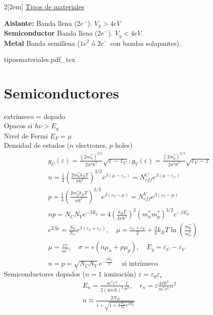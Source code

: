 \documentclass[leqno]{article}
\newcommand{\incfig}[1]{%
\begin{center}
\def\svgwidth{0.9\columnwidth}
{#1.pdf_tex}
\end{center}
}
\begin{document}
\begin{multicols}{2}[\columnsep2em]
\underline{Tipos de materiales}

\textbf{Aislante:} Banda llena (2$e^-$). $V_g>4eV$\\
\textbf{Semiconductor} Banda llena ($2e^-$).  $V_g<4eV$.\\
\textbf{Metal} Banda semillena ($1e^2$ ó $2e^-$ con bandas solapantes).

\incfig{tiposmateriales}

\section{Semiconductores}
extrínseco = dopado\\
Opacos si $h \nu > E_g$\\
Nivel de Fermi $E_F = \mu$\\
Densidad de estados ($n$ electrones, $p$ holes)
\begin{align*}
&g_C(\varepsilon ) = \frac{(2m^*_n) ^{2 /3}}{2\pi ^2\hbar ^3}\sqrt{\varepsilon -\varepsilon _C} ; 
g_V(\varepsilon ) = \frac{(2m^*_p) ^{2 /3}}{2\pi ^2\hbar ^3}\sqrt{\varepsilon _V-\varepsilon } \\
&n = \frac{1}{4}\left(\frac{2 m^*_nk_BT}{\pi \hbar ^2}\right)^{3 /2} e ^{\beta(\mu -\varepsilon _C)} = N_{eff}^C e ^{\beta (\mu -\varepsilon _C)}\\
&p = \frac{1}{4}\left(\frac{2 m^*_pk_BT}{\pi \hbar ^2}\right)^{3 /2} e ^{\beta(\varepsilon _V-\mu )} = N_{eff}^V e ^{\beta (\varepsilon _V-\mu )}\\
& np = N_CN_V e ^{-\beta E_g} = 4 \left(\frac{k_BT}{2\pi \hbar ^2}\right)^3(m_n^*m_p^*)^{3 / 2}e ^{-\beta E_g}\\
& e ^{2\beta \mu } = \frac{N_V}{N_C} e ^{\beta (\varepsilon _V + \varepsilon _C)}, \quad
\mu  = \frac{\varepsilon _C+\varepsilon _V}{2} + \frac{3}{4}k_BT\ln\left( \frac{m_p^*}{m_n^*} \right) \\
& \mu = \frac{e\tau }{m^*}, \quad \sigma  = e(n\mu _n+ p\mu _p), \quad E_g = \varepsilon _C-\varepsilon _V\\
& n = p = \sqrt{N_CN_V}e ^{-\frac{\beta E_g}{2}} \quad \text{ si intrínseco}
\end{align*}
Semiconductores dopados ($n=1$ ionización) $\varepsilon = \varepsilon _0\varepsilon_r$
\begin{align*}
  &E_n = \frac{m^*e^4}{2(4\pi \varepsilon \hbar )^2} \frac{1}{n^2}, \quad r_n = \varepsilon \frac{4\pi \hbar ^2}{m^*e^2}n^2\\
  &n \approx \frac{2N_D}{1+\sqrt{1+4 \frac{N_D}{N_C} e ^{\beta E_d} }} 
\end{align*}

\end{multicols}
\end{document}
